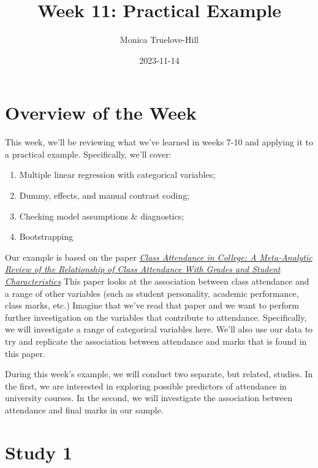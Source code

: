 \documentclass[
]{article}
\title{Week 11: Practical Example}
\author{Monica Truelove-Hill}
\date{2023-11-14}
\providecommand{\tightlist}{%
  \setlength{\itemsep}{0pt}\setlength{\parskip}{0pt}}
\begin{document}
\maketitle

{
\setcounter{tocdepth}{2}
\tableofcontents
}
\hypertarget{overview-of-the-week}{%
\section{Overview of the Week}\label{overview-of-the-week}}

This week, we'll be reviewing what we've learned in weeks 7-10 and applying it to a practical example. Specifically, we'll cover:

\begin{enumerate}
\def\labelenumi{\arabic{enumi})}
\tightlist
\item
  Multiple linear regression with categorical variables;
\item
  Dummy, effects, and manual contrast coding;
\item
  Checking model assumptions \& diagnostics;
\item
  Bootstrapping
\end{enumerate}

Our example is based on the paper \emph{\href{https://www.ucsd.ac.uk/wp-content/uploads/Benefits-of-attendance-for-students.pdf}{Class Attendance in College: A Meta-Analytic Review of the Relationship of Class Attendance With Grades and Student Characteristics}} This paper looks at the association between class attendance and a range of other variables (such as student personality, academic performance, class marks, etc.) Imagine that we've read that paper and we want to perform further investigation on the variables that contribute to attendance. Specifically, we will investigate a range of categorical variables here. We'll also use our data to try and replicate the association between attendance and marks that is found in this paper.

During this week's example, we will conduct two separate, but related, studies. In the first, we are interested in exploring possible predictors of attendance in university courses. In the second, we will investigate the association between attendance and final marks in our sample.

\hypertarget{study-1}{%
\section{Study 1}\label{study-1}}
\end{document}
